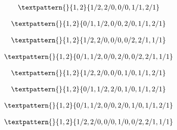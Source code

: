 \begin{equation}
	\begin{gathered}
		\textpattern{}{1,2}{1/2,2/0,0/0,1/1,2/1}
	\end{gathered}
	\label{cls:78}
\end{equation}

\begin{equation}
	\begin{gathered}
		\textpattern{}{1,2}{0/1,1/2,0/0,2/0,1/1,2/1}
	\end{gathered}
	\label{cls:79}
\end{equation}

\begin{equation}
	\begin{gathered}
		\textpattern{}{1,2}{1/2,2/0,0/0,0/2,2/1,1/1}
	\end{gathered}
	\label{cls:80}
\end{equation}

\begin{equation}
	\begin{gathered}
		\textpattern{}{1,2}{0/1,1/2,0/0,2/0,0/2,2/1,1/1}
	\end{gathered}
	\label{cls:81}
\end{equation}

\begin{equation}
	\begin{gathered}
		\textpattern{}{1,2}{1/2,2/0,0/0,1/0,1/1,2/1}
	\end{gathered}
	\label{cls:82}
\end{equation}

\begin{equation}
	\begin{gathered}
		\textpattern{}{1,2}{0/1,1/2,2/0,1/0,1/1,2/1}
	\end{gathered}
	\label{cls:83}
\end{equation}

\begin{equation}
	\begin{gathered}
		\textpattern{}{1,2}{0/1,1/2,0/0,2/0,1/0,1/1,2/1}
	\end{gathered}
	\label{cls:84}
\end{equation}

\begin{equation}
	\begin{gathered}
		\textpattern{}{1,2}{1/2,2/0,0/0,1/0,0/2,2/1,1/1}
	\end{gathered}
	\label{cls:85}
\end{equation}

